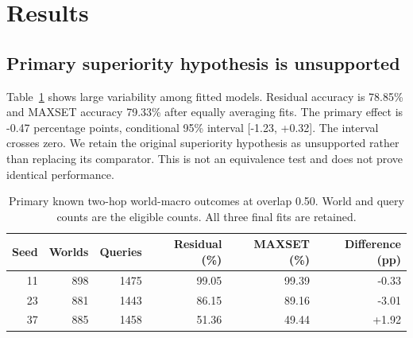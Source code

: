 \documentclass[10pt]{article}
\begin{document}
\section{Results}
\subsection{Primary superiority hypothesis is unsupported}
Table~\ref{tab:fits} shows large variability among fitted models. Residual
accuracy is 78.85\% and MAXSET accuracy 79.33\% after equally averaging fits.
The primary effect is -0.47 percentage points, conditional 95\% interval
[-1.23, +0.32]. The interval crosses zero. We retain the original
superiority hypothesis as unsupported rather than replacing its comparator.
This is not an equivalence test and does not prove identical performance.

\begin{table}[ht]
\centering
\small
\begin{tabular}{rrrrrr}\toprule
Seed & Worlds & Queries & Residual (\%) & MAXSET (\%) & Difference (pp)\\\midrule
11 & 898 & 1475 & 99.05 & 99.39 & -0.33 \\
23 & 881 & 1443 & 86.15 & 89.16 & -3.01 \\
37 & 885 & 1458 & 51.36 & 49.44 & +1.92 \\
\bottomrule\end{tabular}
\caption{Primary known two-hop world-macro outcomes at overlap 0.50. World
and query counts are the eligible counts. All three final fits are retained.}
\label{tab:fits}
\end{table}
\end{document}

